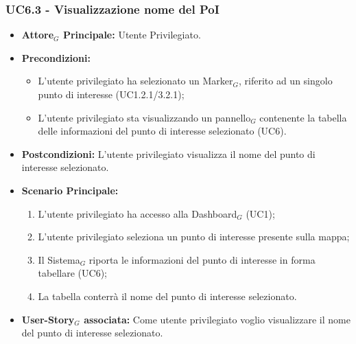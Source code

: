 \documentclass[10pt]{article}
\begin{document}
\begin{justify}
 \subsubsection{\textbf{UC6.3 - Visualizzazione nome del PoI}}
 \begin{itemize}
     \item \textbf{Attore$_G$ Principale:} Utente Privilegiato.
     \item \textbf{Precondizioni:}
       \begin{itemize}
    	        \item L'utente privilegiato ha selezionato un Marker$_G$, riferito ad un singolo punto di interesse (UC1.2.1/3.2.1);
          \item L'utente privilegiato sta visualizzando un pannello$_G$ contenente la tabella delle informazioni del punto di interesse selezionato (UC6).
       \end{itemize}
     \item \textbf{Postcondizioni:} L'utente privilegiato visualizza il nome del punto di interesse selezionato.
     \item \textbf{Scenario Principale:}
        \begin{enumerate}
            \item L'utente privilegiato ha accesso alla Dashboard$_G$ (UC1);
            \item L'utente privilegiato seleziona un punto di interesse presente sulla mappa;
            \item Il Sistema$_G$ riporta le informazioni del punto di interesse in forma tabellare (UC6);
            \item La tabella conterrà il nome del punto di interesse selezionato.
        \end{enumerate}
     \item \textbf{User-Story$_G$ associata:} Come utente privilegiato voglio visualizzare il nome del punto di interesse selezionato. 
 \end{itemize}

\end{justify}
\end{document}
